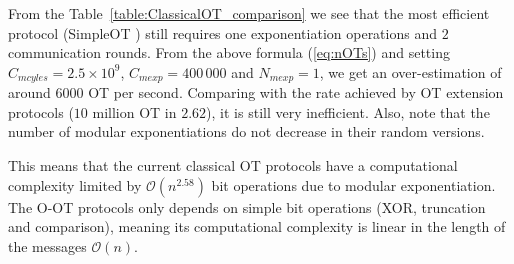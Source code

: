 
From the Table~\ref{table:ClassicalOT_comparison} we see that the most efficient protocol (SimpleOT \cite{CO15}) still requires one exponentiation operations and $2$ communication rounds. From the above formula (\ref{eq:nOTs}) and setting $C_{mcyles} = 2.5 \times 10^9$, $C_{mexp} = 400\,000$ and $N_{mexp} = 1$, we get an over-estimation of around $6 000$ OT per second. Comparing with the rate achieved by OT extension protocols ($10$ million OT in $2.62$), it is still very inefficient. Also, note that the number of modular exponentiations do not decrease in their random versions. 

This means that the current classical OT protocols have a computational complexity limited by $\mathcal{O}(n^{2.58})$ bit operations due to modular exponentiation. The O-OT protocols only depends on simple bit operations (XOR, truncation and comparison), meaning its computational complexity is linear in the length of the messages $\mathcal{O}(n)$.

